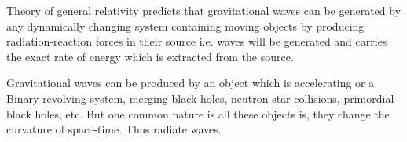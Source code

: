 Theory of general relativity predicts that gravitational waves can be generated by any dynamically changing system containing moving objects by producing radiation-reaction forces in their source i.e. waves will be generated and carries the exact rate of energy which is extracted from the source. 

Gravitational waves can be produced by an object which is accelerating or a Binary revolving system, merging black holes, neutron star collisions, primordial black holes, etc. But one common nature is all these objects is, they change the curvature of space-time. Thus radiate waves. 

